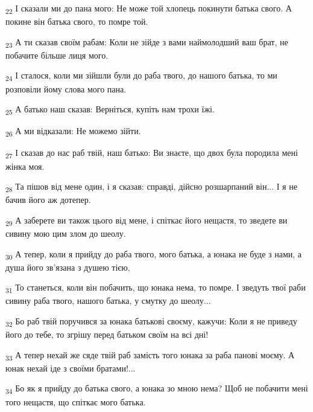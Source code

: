 \begin{tcolorbox}
\textsubscript{22} І сказали ми до пана мого: Не може той хлопець покинути батька свого. А покине він батька свого, то помре той.
\end{tcolorbox}
\begin{tcolorbox}
\textsubscript{23} А ти сказав своїм рабам: Коли не зійде з вами наймолодший ваш брат, не побачите більше лиця мого.
\end{tcolorbox}
\begin{tcolorbox}
\textsubscript{24} І сталося, коли ми зійшли були до раба твого, до нашого батька, то ми розповіли йому слова мого пана.
\end{tcolorbox}
\begin{tcolorbox}
\textsubscript{25} А батько наш сказав: Верніться, купіть нам трохи їжі.
\end{tcolorbox}
\begin{tcolorbox}
\textsubscript{26} А ми відказали: Не можемо зійти.
\end{tcolorbox}
\begin{tcolorbox}
\textsubscript{27} І сказав до нас раб твій, наш батько: Ви знаєте, що двох була породила мені жінка моя.
\end{tcolorbox}
\begin{tcolorbox}
\textsubscript{28} Та пішов від мене один, і я сказав: справді, дійсно розшарпаний він... І я не бачив його аж дотепер.
\end{tcolorbox}
\begin{tcolorbox}
\textsubscript{29} А заберете ви також цього від мене, і спіткає його нещастя, то зведете ви сивину мою цим злом до шеолу.
\end{tcolorbox}
\begin{tcolorbox}
\textsubscript{30} А тепер, коли я прийду до раба твого, мого батька, а юнака не буде з нами, а душа його зв'язана з душею тією,
\end{tcolorbox}
\begin{tcolorbox}
\textsubscript{31} То станеться, коли він побачить, що юнака нема, то помре. І зведуть твої раби сивину раба твого, нашого батька, у смутку до шеолу...
\end{tcolorbox}
\begin{tcolorbox}
\textsubscript{32} Бо раб твій поручився за юнака батькові своєму, кажучи: Коли я не приведу його до тебе, то згрішу перед батьком своїм на всі дні!
\end{tcolorbox}
\begin{tcolorbox}
\textsubscript{33} А тепер нехай же сяде твій раб замість того юнака за раба панові моєму. А юнак нехай іде з своїми братами!...
\end{tcolorbox}
\begin{tcolorbox}
\textsubscript{34} Бо як я прийду до батька свого, а юнака зо мною нема? Щоб не побачити мені того нещастя, що спіткає мого батька.
\end{tcolorbox}
